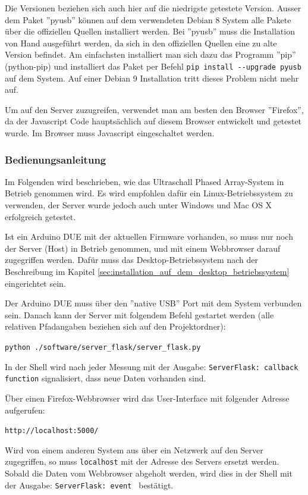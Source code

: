 Die Versionen beziehen sich auch hier auf die niedrigste getestete Version. Ausser dem Paket ''pyusb'' können auf dem verwendeten Debian 8 System alle Pakete über die offiziellen Quellen installiert werden. Bei ''pyusb'' muss die Installation von Hand ausgeführt werden, da sich in den offiziellen Quellen eine zu alte Version befindet. Am einfachsten installiert man sich dazu das Programm ''pip'' (python-pip) und installiert das Paket per Befehl \texttt{pip install -{}-upgrade pyusb} auf dem System. Auf einer Debian 9 Installation tritt dieses Problem nicht mehr auf.

Um auf den Server zuzugreifen, verwendet man am besten den Browser ''Firefox'', da der Java\-script Code hauptsächlich auf diesem Browser entwickelt und getestet wurde. Im Browser muss Javascript eingeschaltet werden.


\subsubsection{Bedienungsanleitung}\label{sec:bedienungsanleitung}
Im Folgenden wird beschrieben, wie das Ultraschall Phased Array-System in Betrieb genommen wird. Es wird empfohlen dafür ein Linux-Betriebssystem zu verwenden, der Server wurde jedoch auch unter Windows und Mac OS X erfolgreich getestet.

Ist ein Arduino DUE mit der aktuellen Firmware vorhanden, so muss nur noch der Server (Host) in Betrieb genommen, und mit einem Webbrowser darauf zugegriffen werden. Dafür muss das Desktop-Betriebssystem nach der Beschreibung im Kapitel \ref{sec:installation_auf_dem_desktop_betriebssystem} eingerichtet sein.

Der Arduino DUE muss über den ''native USB'' Port mit dem System verbunden sein. Danach kann der Server mit folgendem Befehl gestartet werden (alle relativen Pfadangaben beziehen sich auf den Projektordner):

\texttt{python ./software/server\_flask/server\_flask.py}

In der Shell wird nach jeder Messung mit der Ausgabe: \texttt{ServerFlask: callback function} signalisiert, dass neue Daten vorhanden sind.

Über einen Firefox-Webbrowser wird das User-Interface mit folgender Adresse aufgerufen:

\texttt{http://localhost:5000/}

Wird von einem anderen System aus über ein Netzwerk auf den Server zugegriffen, so muss \texttt{localhost} mit der Adresse des Servers ersetzt werden.
Sobald die Daten vom Webbrowser abgeholt werden, wird dies in der Shell mit der Ausgabe: \texttt{ServerFlask: event
} bestätigt.

